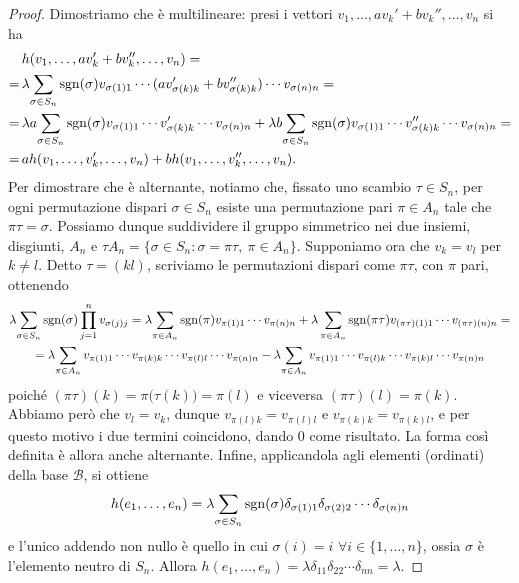 \begin{proof}
	Dimostriamo che è multilineare: presi i vettori $v_1,\dots,av_k'+bv_k'',\dots,v_n$ si ha
	\begin{equation}
		\begin{split}
			&h(v_1,\dots,av_k'+bv_k'',\dots,v_n)=\\
			=\,&\lambda\!\sum_{\sigma\in S_n}\operatorname{sgn}(\sigma)v_{\sigma(1)1}\cdots(av_{\sigma(k)k}'+bv_{\sigma(k)k}'')\cdots v_{\sigma(n)n}=\\
			=\,&\lambda a\!\sum_{\sigma\in S_n}\operatorname{sgn}(\sigma)v_{\sigma(1)1}\cdots v_{\sigma(k)k}'\cdots v_{\sigma(n)n}+
			\lambda b\!\sum_{\sigma\in S_n}\operatorname{sgn}(\sigma)v_{\sigma(1)1}\cdots v_{\sigma(k)k}''\cdots v_{\sigma(n)n}=\\
			=\,&ah(v_1,\dots,v_k',\dots,v_n)+bh(v_1,\dots,v_k'',\dots,v_n).
		\end{split}
	\end{equation}
	Per dimostrare che è alternante, notiamo che, fissato uno scambio $\tau\in S_n$, per ogni permutazione dispari $\sigma\in S_n$ esiste una permutazione pari $\pi\in A_n$ tale che $\pi\tau=\sigma$.
	Possiamo dunque suddividere il gruppo simmetrico nei due insiemi, disgiunti, $A_n$ e $\tau A_n=\{\sigma\in S_n\colon\sigma=\pi\tau,\ \pi\in A_n\}$.
	Supponiamo ora che $v_k=v_l$ per $k\ne l$.
	Detto $\tau=(kl)$, scriviamo le permutazioni dispari come $\pi\tau$, con $\pi$ pari, ottenendo
	\begin{multline}
		\lambda\!\sum_{\sigma\in S_n}\operatorname{sgn}(\sigma)\prod_{j=1}^nv_{\sigma(j)j}=
		\lambda\!\sum_{\pi\in A_n}\operatorname{sgn}(\pi)v_{\pi(1)1}\cdots v_{\pi(n)n}+\lambda\sum_{\pi\in A_n}\operatorname{sgn}(\pi\tau)v_{(\pi\tau)(1)1}\cdots v_{(\pi\tau)(n)n}=\\=
		\lambda\!\sum_{\pi\in A_n}v_{\pi(1)1}\cdots v_{\pi(k)k}\cdots v_{\pi(l)l}\cdots v_{\pi(n)n}-
		\lambda\!\sum_{\pi\in A_n}v_{\pi(1)1}\cdots v_{\pi(l)k}\cdots v_{\pi(k)l}\cdots v_{\pi(n)n}
	\end{multline}
	poich\'e $(\pi\tau)(k)=\pi\big(\tau(k)\big)=\pi(l)$ e viceversa $(\pi\tau)(l)=\pi(k)$.
	Abbiamo però che $v_l=v_k$, dunque $v_{\pi(l)k}=v_{\pi(l)l}$ e $v_{\pi(k)k}=v_{\pi(k)l}$, e per questo motivo i due termini coincidono, dando 0 come risultato.
	La forma cos\`i definita è allora anche alternante.
	Infine, applicandola agli elementi (ordinati) della base $\mathcal B$, si ottiene
	\begin{equation}
		h(e_1,\dots,e_n)=\lambda\!\sum_{\sigma\in S_n}\operatorname{sgn}(\sigma)\delta_{\sigma(1)1}\delta_{\sigma(2)2}\cdots\delta_{\sigma(n)n}
	\end{equation}
	e l'unico addendo non nullo è quello in cui $\sigma(i)=i$ $\forall i\in\{1,\dots,n\}$, ossia $\sigma$ è l'elemento neutro di $S_n$.
	Allora $h(e_1,\dots,e_n)=\lambda\delta_{11}\delta_{22}\cdots\delta_{nn}=\lambda$.
\end{proof}
